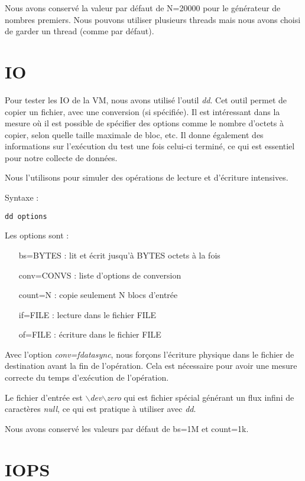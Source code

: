 Nous avons conservé la valeur par défaut de N=20000 pour le générateur de nombres premiers. Nous pouvons utiliser plusieurs threads mais nous avons choisi de garder un thread (comme par défaut).

\section{IO}
Pour tester les IO de la VM, nous avons utilisé l'outil \textit{dd}. Cet outil permet de copier un fichier, avec une conversion (si spécifiée). Il est intéressant dans la mesure où il est possible de spécifier des options comme le nombre d'octets à copier, selon quelle taille maximale de bloc, etc. Il donne également des informations sur l'exécution du test une fois celui-ci terminé, ce qui est essentiel pour notre collecte de données.

Nous l'utilisons pour simuler des opérations de lecture et d'écriture intensives. \newline

Syntaxe : 
\begin{verbatim}
dd options
\end{verbatim}
Les options sont : 
\begin{itemize}
  \item [bs=BYTES] : lit et écrit jusqu'à BYTES octets à la fois
  \item [conv=CONVS] : liste d'options de conversion
  \item [count=N] : copie seulement N blocs d'entrée
  \item [if=FILE] : lecture dans le fichier FILE
  \item [of=FILE] : écriture dans le fichier FILE \newline
\end{itemize}
	
Avec l'option \textit{conv=fdatasync}, nous forçons l'écriture physique dans le fichier de destination avant la fin de l'opération. Cela est nécessaire pour avoir une mesure correcte du temps d'exécution de l'opération.

Le fichier d'entrée est \textit{$\backslash$dev$\backslash$zero} qui est fichier spécial générant un flux infini de caractères \textit{null}, ce qui est pratique à utiliser avec \textit{dd}.

Nous avons conservé les valeurs par défaut de bs=1M et count=1k.

\section{IOPS}

